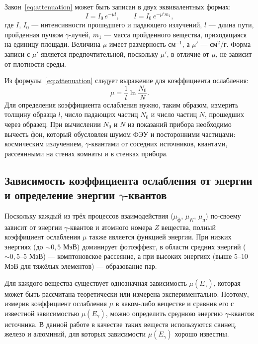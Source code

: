 \documentclass[12pt,a4paper]{article}
\begin{document}
Закон~\eqref{eq:attenuation} может быть записан в двух эквивалентных формах:
\begin{equation}
    I = I_0 \, e^{-\mu l}, \qquad I = I_0 \, e^{-\mu' m_1},
    \label{eq:two_forms}
\end{equation}
где $I$, $I_0$ --- интенсивности прошедшего и падающего излучений, $l$ --- длина пути, пройденная пучком $\gamma$-лучей, $m_1$ --- масса пройденного вещества, приходящаяся на единицу площади. Величина $\mu$ имеет размерность см$^{-1}$, а $\mu'$ --- см$^2$/г. Форма записи с $\mu'$ является предпочтительной, поскольку $\mu'$, в отличие от $\mu$, не зависит от плотности среды.

Из формулы~\eqref{eq:attenuation} следует выражение для коэффициента ослабления:
\begin{equation}
    \mu = \frac{1}{l} \ln \frac{N_0}{N}.
    \label{eq:mu_calc}
\end{equation}
Для определения коэффициента ослабления нужно, таким образом, измерить толщину образца $l$, число падающих частиц $N_0$ и число частиц $N$, прошедших через образец. При вычислении $N_0$ и $N$ из показаний прибора необходимо вычесть фон, который обусловлен шумом ФЭУ и посторонними частицами: космическим излучением, $\gamma$-квантами от соседних источников, квантами, рассеянными на стенах комнаты и в стенках прибора.

\subsection*{Зависимость коэффициента ослабления от энергии и определение энергии $\gamma$-квантов}

Поскольку каждый из трёх процессов взаимодействия ($\mu_\text{ф}$, $\mu_K$, $\mu_\text{п}$) по-своему зависит от энергии $\gamma$-квантов и атомного номера $Z$ вещества, полный коэффициент ослабления $\mu$ также является функцией энергии. При низких энергиях (до $\sim 0{,}5$ МэВ) доминирует фотоэффект, в области средних энергий ($\sim 0{,}5$--$5$ МэВ) --- комптоновское рассеяние, а при высоких энергиях (выше $5$--$10$ МэВ для тяжёлых элементов) --- образование пар.

Для каждого вещества существует однозначная зависимость $\mu(E_\gamma)$, которая может быть рассчитана теоретически или измерена экспериментально. Поэтому, измерив коэффициент ослабления $\mu$ в каком-либо веществе и сравнив его с известной зависимостью $\mu(E_\gamma)$, можно определить среднюю энергию $\gamma$-квантов источника. В данной работе в качестве таких веществ используются свинец, железо и алюминий, для которых зависимости $\mu(E_\gamma)$ хорошо известны.
\end{document}
